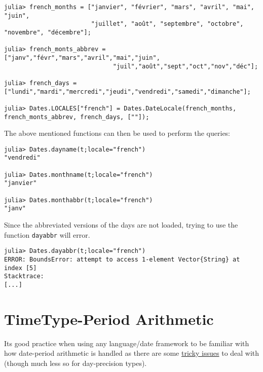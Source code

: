 \begin{verbatim}
julia> french_months = ["janvier", "février", "mars", "avril", "mai", "juin",
                        "juillet", "août", "septembre", "octobre", "novembre", "décembre"];

julia> french_monts_abbrev = ["janv","févr","mars","avril","mai","juin",
                              "juil","août","sept","oct","nov","déc"];

julia> french_days = ["lundi","mardi","mercredi","jeudi","vendredi","samedi","dimanche"];

julia> Dates.LOCALES["french"] = Dates.DateLocale(french_months, french_monts_abbrev, french_days, [""]);
\end{verbatim}



The above mentioned functions can then be used to perform the queries:




\begin{verbatim}
julia> Dates.dayname(t;locale="french")
"vendredi"

julia> Dates.monthname(t;locale="french")
"janvier"

julia> Dates.monthabbr(t;locale="french")
"janv"
\end{verbatim}



Since the abbreviated versions of the days are not loaded, trying to use the function \texttt{dayabbr} will error.




\begin{verbatim}
julia> Dates.dayabbr(t;locale="french")
ERROR: BoundsError: attempt to access 1-element Vector{String} at index [5]
Stacktrace:
[...]
\end{verbatim}



\hypertarget{10010400361329749456}{}


\section{TimeType-Period Arithmetic}



It{\textquotesingle}s good practice when using any language/date framework to be familiar with how date-period arithmetic is handled as there are some \href{https://codeblog.jonskeet.uk/2010/12/01/the-joys-of-date-time-arithmetic/}{tricky issues} to deal with (though much less so for day-precision types).



